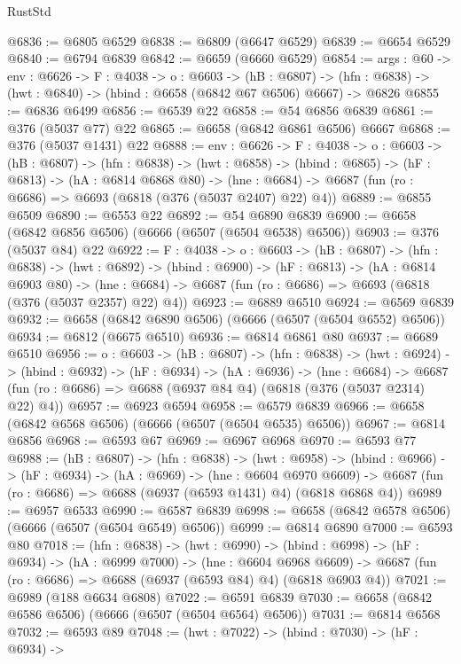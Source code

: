\begin{lexlean}{RustStd}
\begin{coremodule}
@6836 := @6805 @6529
@6838 := @6809 (@6647 @6529)
@6839 := @6654 @6529
@6840 := @6794 @6839
@6842 := @6659 (@6660 @6529)
@6854 := {args : @60} ->
  {env : @6626} ->
  {F : @4038} ->
  {o : @6603} ->
  (hB : @6807) -> (hfn : @6838) -> (hwt : @6840) -> (hbind : @6658 (@6842 @67 @6506) @6667) -> @6826
@6855 := @6836 @6499
@6856 := @6539 @22
@6858 := @54 @6856 @6839
@6861 := @376 (@5037 @77) @22
@6865 := @6658 (@6842 @6861 @6506) @6667
@6868 := @376 (@5037 @1431) @22
@6888 := {env : @6626} ->
  {F : @4038} ->
  {o : @6603} ->
  (hB : @6807) ->
  (hfn : @6838) ->
  (hwt : @6858) ->
  (hbind : @6865) ->
  (hF : @6813) ->
  (hA : @6814 @6868 @80) ->
  (hne : @6684) -> @6687 (fun (ro : @6686) => @6693 (@6818 (@376 (@5037 @2407) @22) @4))
@6889 := @6855 @6509
@6890 := @6553 @22
@6892 := @54 @6890 @6839
@6900 := @6658 (@6842 @6856 @6506) (@6666 (@6507 (@6504 @6538) @6506))
@6903 := @376 (@5037 @84) @22
@6922 := {F : @4038} ->
  {o : @6603} ->
  (hB : @6807) ->
  (hfn : @6838) ->
  (hwt : @6892) ->
  (hbind : @6900) ->
  (hF : @6813) ->
  (hA : @6814 @6903 @80) ->
  (hne : @6684) -> @6687 (fun (ro : @6686) => @6693 (@6818 (@376 (@5037 @2357) @22) @4))
@6923 := @6889 @6510
@6924 := @6569 @6839
@6932 := @6658 (@6842 @6890 @6506) (@6666 (@6507 (@6504 @6552) @6506))
@6934 := @6812 (@6675 @6510)
@6936 := @6814 @6861 @80
@6937 := @6689 @6510
@6956 := {o : @6603} ->
  (hB : @6807) ->
  (hfn : @6838) ->
  (hwt : @6924) ->
  (hbind : @6932) ->
  (hF : @6934) ->
  (hA : @6936) ->
  (hne : @6684) ->
  @6687 (fun (ro : @6686) => @6688 (@6937 @84 @4) (@6818 (@376 (@5037 @2314) @22) @4))
@6957 := @6923 @6594
@6958 := @6579 @6839
@6966 := @6658 (@6842 @6568 @6506) (@6666 (@6507 (@6504 @6535) @6506))
@6967 := @6814 @6856
@6968 := @6593 @67
@6969 := @6967 @6968
@6970 := @6593 @77
@6988 := (hB : @6807) ->
  (hfn : @6838) ->
  (hwt : @6958) ->
  (hbind : @6966) ->
  (hF : @6934) ->
  (hA : @6969) ->
  (hne : @6604 @6970 @6609) ->
  @6687 (fun (ro : @6686) => @6688 (@6937 (@6593 @1431) @4) (@6818 @6868 @4))
@6989 := @6957 @6533
@6990 := @6587 @6839
@6998 := @6658 (@6842 @6578 @6506) (@6666 (@6507 (@6504 @6549) @6506))
@6999 := @6814 @6890
@7000 := @6593 @80
@7018 := (hfn : @6838) ->
  (hwt : @6990) ->
  (hbind : @6998) ->
  (hF : @6934) ->
  (hA : @6999 @7000) ->
  (hne : @6604 @6968 @6609) ->
  @6687 (fun (ro : @6686) => @6688 (@6937 (@6593 @84) @4) (@6818 @6903 @4))
@7021 := @6989 (@188 @6634 @6808)
@7022 := @6591 @6839
@7030 := @6658 (@6842 @6586 @6506) (@6666 (@6507 (@6504 @6564) @6506))
@7031 := @6814 @6568
@7032 := @6593 @89
@7048 := (hwt : @7022) ->
  (hbind : @7030) ->
  (hF : @6934) ->

\end{coremodule}
\end{lexlean}

